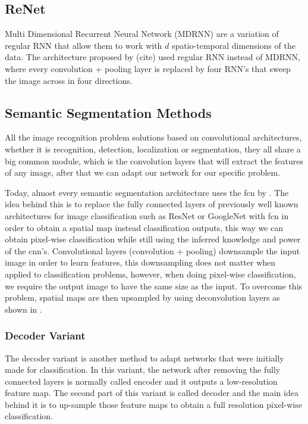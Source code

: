 \subsection{ReNet}
Multi Dimensional Recurrent Neural Network (MDRNN) are a variation of regular RNN that allow them to work with $d$ spatio-temporal dimensions of the data. The architecture proposed by (cite) used regular RNN instead of MDRNN, where every convolution + pooling layer is replaced by four RNN's that sweep the image across in four directions. 

\subsection{Semantic Segmentation Methods}
All the image recognition problem solutions based on convolutional architectures, whether it is recognition, detection, localization or segmentation, they all share a big common module, which is the convolution layers that will extract the features of any image, after that we can adapt our network for our specific problem.

Today, almost every semantic segmentation architecture uses the \gls{fcn} by \cite{DBLP:journals/corr/LongSD14}. The idea behind this is to replace the fully connected layers of previously well known architectures for image classification such as ResNet or GoogleNet with \gls{fcn} in order to obtain a spatial map instead classification outputs, this way we can obtain pixel-wise classification while still using the inferred knowledge and power of the \gls{cnn}'s. Convolutional layers (convolution + pooling) downsample the input image in order to learn features, this downsampling does not matter when applied to classification problems, however, when doing pixel-wise classification, we require the output image to have the same size as the input. To overcome this problem, spatial maps are then upsampled by using deconvolution layers as shown in \cite{deconvolution}.

\subsubsection{Decoder Variant}
The decoder variant is another method to adapt networks that were initially made for classification. In this variant, the network after removing the fully connected layers is normally called encoder and it outputs a low-resolution feature map. The second part of this variant is called decoder and the main idea behind it is to up-sample those feature maps to obtain a full resolution pixel-wise classification.

